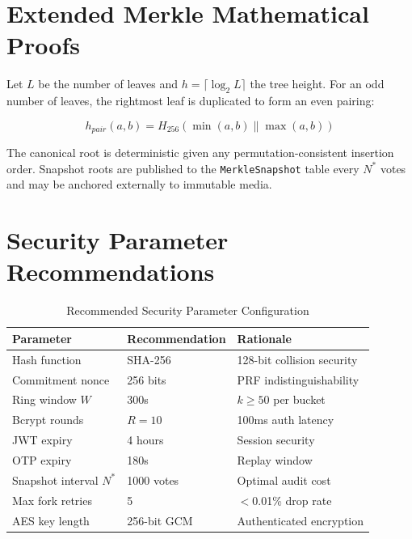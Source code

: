 \documentclass[journal,10pt,twocolumn]{IEEEtran}
\begin{document}
\appendices

\section{Extended Merkle Mathematical Proofs}

Let $L$ be the number of leaves and $h = \lceil \log_2 L \rceil$ the tree height. For an odd number of leaves, the rightmost leaf is duplicated to form an even pairing:

\begin{equation}
    h_{pair}(a, b) = H_{256}(\min(a,b) \| \max(a,b))
\end{equation}

The canonical root is deterministic given any permutation-consistent insertion order. Snapshot roots are published to the \texttt{MerkleSnapshot} table every $N^*$ votes and may be anchored externally to immutable media.

\section{Security Parameter Recommendations}

\begin{table}[htbp]
\caption{Recommended Security Parameter Configuration}
\label{tab:security_params}
\centering
\small
{}
\begin{tabularx}{\linewidth}{@{}lXl@{}}
\toprule
\textbf{Parameter} & \textbf{Recommendation} & \textbf{Rationale} \\
\midrule
Hash function & SHA-256 & 128-bit collision security \\
Commitment nonce & 256 bits & PRF indistinguishability \\
Ring window $W$ & 300s & $k \ge 50$ per bucket \\
Bcrypt rounds & $R=10$ & 100ms auth latency \\
JWT expiry & 4 hours & Session security \\
OTP expiry & 180s & Replay window \\
Snapshot interval $N^*$ & 1000 votes & Optimal audit cost \\
Max fork retries & 5 & $<$0.01\% drop rate \\
AES key length & 256-bit GCM & Authenticated encryption \\
\bottomrule
\end{tabularx}
\end{table}
\end{document}
